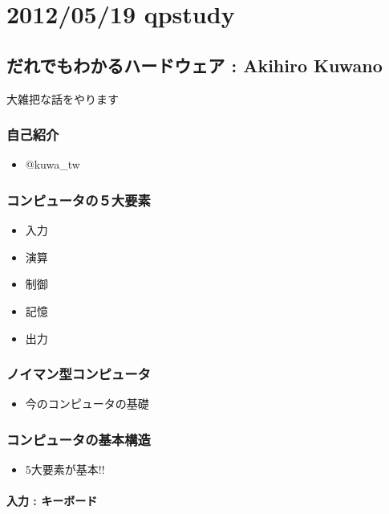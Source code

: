 \documentclass{jsarticle}
\begin{document}
\section{2012/05/19 qpstudy}

\subsection{だれでもわかるハードウェア : Akihiro Kuwano}

大雑把な話をやります

\subsubsection{自己紹介}

\begin{itemize}
\item
  @kuwa\_tw
\end{itemize}
\subsubsection{コンピュータの５大要素}

\begin{itemize}
\item
  入力
\item
  演算
\item
  制御
\item
  記憶
\item
  出力
\end{itemize}
\subsubsection{ノイマン型コンピュータ}

\begin{itemize}
\item
  今のコンピュータの基礎
\end{itemize}
\subsubsection{コンピュータの基本構造}

\begin{itemize}
\item
  5大要素が基本!!
\end{itemize}
\paragraph{入力 : キーボード}
\end{document}
